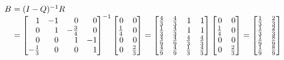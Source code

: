 \[
\begin{array}{r@{\ }l}
	B & = (I - Q)^{-1}R \\
	& =
      \left[
	\begin{array}{@{}rrrr@{}}
		1 & -1 & 0 & 0\\
		0 & 1 & -\frac{3}{4} & 0\\
		0 & 0 & 1 & -1\\
		-\frac{1}{3} & 0 & 0  & 1\\
        \end{array}
      \right]^{-1}
      \left[
        \begin{array}{@{}rr@{}}
		0 & 0 \\
		\frac{1}{4} & 0\\
		0 & 0\\
		0 & \frac{2}{3}\\
        \end{array}
      \right]
      =
      \left[
        \begin{array}{@{}rrrr@{}}
		\frac{4}{3} & \frac{4}{3} & 1 & 1\\
		\frac{1}{3} & \frac{4}{3} & 1 & 1\\
		\frac{4}{9} & \frac{4}{9} & \frac{4}{3} & \frac{4}{3}\\
		\frac{4}{9} & \frac{4}{9} & \frac{1}{3} & \frac{4}{3}\\
        \end{array}
      \right]
      \left[
        \begin{array}{@{}rr@{}}
		0 & 0 \\
		\frac{1}{4} & 0\\
		0 & 0\\
		0 & \frac{2}{3}\\
        \end{array}
      \right]
      =
      \left[
        \begin{array}{@{}rr@{}}
		\frac{1}{3} & \frac{2}{3} \\
		\frac{1}{3} & \frac{2}{3} \\
		\frac{1}{9} & \frac{8}{9} \\
		\frac{1}{9} & \frac{8}{9} \\
        \end{array}
      \right]
\end{array}
\]
